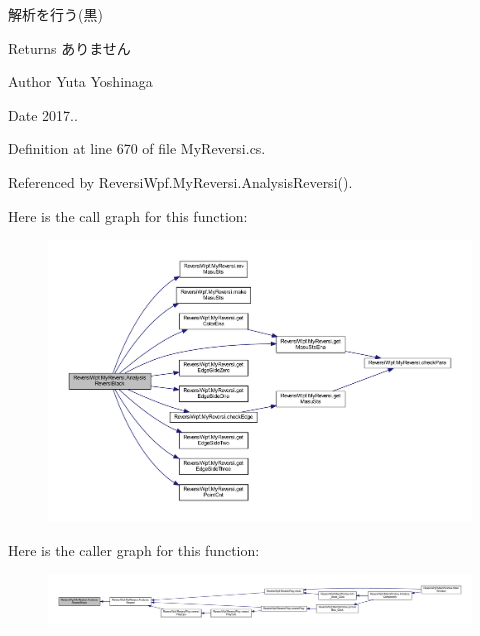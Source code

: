 解析を行う(黒) 

\begin{DoxyReturn}{Returns}
ありません 
\end{DoxyReturn}
\begin{DoxyAuthor}{Author}
Yuta Yoshinaga 
\end{DoxyAuthor}
\begin{DoxyDate}{Date}
2017.. 
\end{DoxyDate}


Definition at line 670 of file My\+Reversi.\+cs.



Referenced by Reversi\+Wpf.\+My\+Reversi.\+Analysis\+Reversi().

Here is the call graph for this function\+:
\nopagebreak
\begin{figure}[H]
\begin{center}
\leavevmode
\includegraphics[width=350pt]{class_reversi_wpf_1_1_my_reversi_af7ca68ea9f05d79c1debbdc320555098_cgraph}
\end{center}
\end{figure}
Here is the caller graph for this function\+:
\nopagebreak
\begin{figure}[H]
\begin{center}
\leavevmode
\includegraphics[width=350pt]{class_reversi_wpf_1_1_my_reversi_af7ca68ea9f05d79c1debbdc320555098_icgraph}
\end{center}
\end{figure}
\mbox{\label{class_reversi_wpf_1_1_my_reversi_a7be281b0dbae11afb652260b4d30f128}} 
